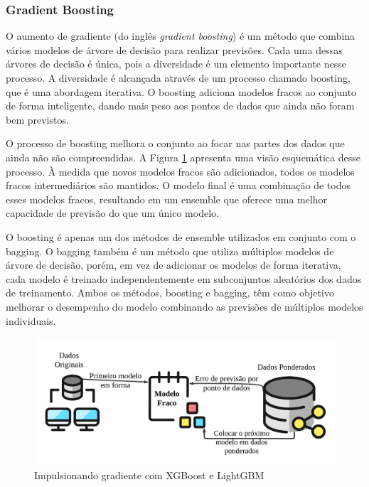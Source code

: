 \subsubsection{Gradient Boosting}\label{subsubsec:lgbxgb}

O aumento de gradiente (do inglês \textit{gradient boosting}) é um método que combina vários modelos de árvore de decisão para realizar previsões. Cada uma dessas árvores de decisão é única, pois a diversidade é um elemento importante nesse processo. A diversidade é alcançada através de um processo chamado boosting, que é uma abordagem iterativa. O boosting adiciona modelos fracos ao conjunto de forma inteligente, dando mais peso aos pontos de dados que ainda não foram bem previstos. 

O processo de boosting melhora o conjunto ao focar nas partes dos dados que ainda não são compreendidas. A Figura \ref{fig:xgboos} apresenta uma visão esquemática desse processo. À medida que novos modelos fracos são adicionados, todos os modelos fracos intermediários são mantidos. O modelo final é uma combinação de todos esses modelos fracos, resultando em um ensemble que oferece uma melhor capacidade de previsão do que um único modelo.

O boosting é apenas um dos métodos de ensemble utilizados em conjunto com o bagging. O bagging também é um método que utiliza múltiplos modelos de árvore de decisão, porém, em vez de adicionar os modelos de forma iterativa, cada modelo é treinado independentemente em subconjuntos aleatórios dos dados de treinamento. Ambos os métodos, boosting e bagging, têm como objetivo melhorar o desempenho do modelo combinando as previsões de múltiplos modelos individuais.


\begin{figure}[H]
	\centering
	\caption{Impulsionando gradiente com XGBoost e LightGBM}
	\label{fig:xgboos}
	\includegraphics[width=\linewidth]{Modelos/Figuras/xgboos}
	
\end{figure}



